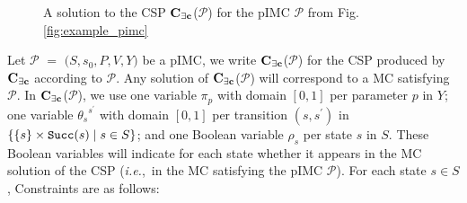 \documentclass{llncs}
\newcommand{\mc}{\textnormal{MC}}
\newcommand{\pimc}{\textnormal{pIMC}}
\newcommand{\csp}{\textnormal{CSP}}
\newcommand{\Mec} {\ensuremath{{\bf C_{{\exists}c}}}}
\newcommand{\ie} {{\em i.e.},\ }
\newcommand{\ttransition}[1]{\ensuremath{\theta_{#1}}}
\newcommand{\transition}[2]{\ensuremath{\ttransition{#1}^{#2}}}
\newcommand{\transitionSet}{\ensuremath{\Theta}}
\newcommand{\Succ}{\ensuremath{{\tt{Succ}}}}
\begin{document}
\begin{figure*}[t]
{\begin{minipage}[t]{.48\textwidth}
\begin{center}
{}
\caption{A solution to the {\csp} {\Mec}($\mathcal{P}$) for the {\pimc} $\mathcal{P}$ from Fig. \ref{fig:example_pimc}}\label{fig:solution_consistency}
\end{center}
\end{minipage}}
\vspace*{-0.4cm}
\end{figure*}

Let $\mathcal{P}$ $=$ $(S,$$s_0,$$P,$$V,$$Y)$ be a {\pimc}, we
write \Mec($\mathcal{P}$) for the {\csp} produced by {\Mec} according
to $\mathcal{P}$. Any solution of \Mec($\mathcal{P}$) will
  correspond to a {\mc} satisfying $\mathcal{P}$.  In
\Mec($\mathcal{P}$), we use one variable $\pi_p$ with domain $[0,1]$
per parameter $p$ in $Y$; one variable $\transition{s}{s^\prime}$ with
domain $[0, 1]$ per transition $(s, s^\prime)$ in $\{ \{s\} \times
\Succ(s) \mid s \in S\}$; and
one Boolean variable $\rho_s$ per state $s$ in $S$.
These Boolean variables will indicate for each state whether it appears in the {\mc} solution of the {\csp} (\ie in the {\mc} satisfying the {\pimc} $\mathcal{P}$).
For each state $s \in S$,  Constraints are as follows:
\end{document}

